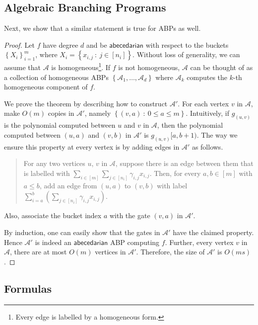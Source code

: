 \documentclass[10pt,a4paper]{article}
\def\set#1{\left\{ #1 \right\}}
\def\inparen#1{\left( #1 \right)}
\def\inbrace#1{\left\{ #1 \right\}}
\def\setdef#1#2{\inbrace{ #1 \ : \ #2}}
\newcommand{\abp}{\textbf{$\mathcal{A}$}}
\newcommand{\abcd}{\mathsf{abecedarian}}
\begin{document}
\subsection{Algebraic Branching Programs}\label{sec:orderABPs}

Next, we show that a similar statement is true for ABPs as well.

\orderABP*

\begin{proof}
	Let $f$ have degree $d$ and be $\abcd$ with respect to the buckets $\set{X_i}_{i=1}^{m}$, where $X_i = \setdef{x_{i,j}}{j \in [n_i]}$.	
	Without loss of generality, we can assume that $\abp$ is homogeneous\footnote{Every edge is labelled by a homogeneous form.}.
	If $f$ is not homogeneous, $\abp$ can be thought of as a collection of homogeneous ABPs $\set{\abp_1, \ldots, \abp_d}$ where $\abp_k$ computes the $k$-th homogeneous component of $f$. 
	
	We prove the theorem by describing how to construct $\abp'$. 
	For each vertex $v$ in $\abp$, make $O(m)$ copies in $\abp'$, namely $\setdef{(v, a)}{0 \leq a \leq m}$. 
	Intuitively, if $g_{(u,v)}$ is the polynomial computed between $u$ and $v$ in $\abp$, then the polynomial computed between $(u, a)$ and $(v, b)$ in $\abp'$ is $g_{(u,v)}[a,b+1)$.
	The way we ensure this property at every vertex is by adding edges in $\abp'$ as follows.
	
	\begin{quote}
		For any two vertices $u$, $v$ in $\abp$, suppose there is an edge between them that is labelled with $\sum_{i \in [m]} \sum_{j \in [n_i]} \gamma_{i,j} x_{i,j}.$ 
		Then, for every $a, b \in [m]$ with $a \leq b$, add an edge from $(u, a)$ to $(v, b)$ with label $\sum_{i = a}^{b} \inparen{\sum_{j \in [n_i]} \gamma_{i,j} x_{i,j}}$.
	\end{quote}

	\noindent Also, associate the bucket index $a$ with the gate $(v, a)$ in $\abp'$. 
	
	By induction, one can easily show that the gates in $\abp'$ have the claimed property.
	Hence $\abp'$ is indeed an $\abcd$ ABP computing $f$.
	Further, every vertex $v$ in $\abp$, there are at most $O(m)$ vertices in $\abp'$.
	Therefore, the size of $\abp'$ is $O(ms)$.
\end{proof}

\subsection{Formulas}\label{sec:orderForms}
\end{document}
